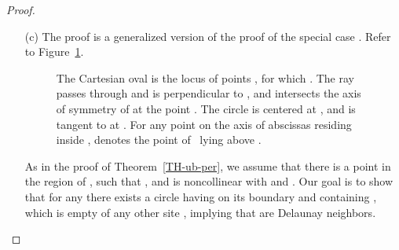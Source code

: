 \documentclass[10pt, conference, compsocconf]{IEEEtran}
\begin{document}
\begin{proof}
\begin{itemize}
   \item[(c)]
      The proof is a generalized version of the proof of the special case
      .  Refer to Figure~\ref{fig:oval}.
\begin{figure}
\centering
{}
      \caption{The Cartesian oval  is the locus of points ,
      for which . The ray 
      passes through  and is perpendicular to ,
      and intersects the axis of symmetry of  at the point .
      The circle  is centered at , and is tangent to  at
      .
      For any point  on the axis of abscissas residing inside , 
      denotes the point of~ lying above .}
      \label{fig:oval}
   \end{figure}
      As in the proof of Theorem~\ref{TH-ub-per}, we assume that there
      is a point  in the region of , such that , and
       is noncollinear with  and .
      Our goal is to show that for any  there exists a circle
      having  on its boundary and containing , which is empty of any
      other site , implying that  are Delaunay neighbors.


\end{itemize}
\end{proof}
\end{document}
